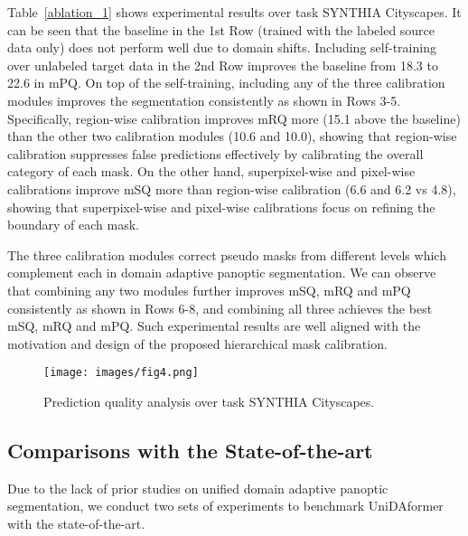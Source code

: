 \documentclass[10pt,twocolumn,letterpaper]{article}
\begin{document}
Table~\ref{ablation_1} shows experimental results over task SYNTHIA  Cityscapes. It can be seen that the baseline in the 1st Row (trained with the labeled source data only) does not perform well due to domain shifts. Including self-training over unlabeled target data in the 2nd Row improves the baseline from 18.3 to 22.6 in mPQ. On top of the self-training, including any of the three calibration modules improves the segmentation consistently as shown in Rows 3-5. Specifically, region-wise calibration improves mRQ more (15.1 above the baseline) than the other two calibration modules (10.6 and 10.0), showing that region-wise calibration suppresses false predictions effectively by calibrating the overall category of each mask. On the other hand, superpixel-wise and pixel-wise calibrations improve mSQ more than region-wise calibration (6.6 and 6.2 vs 4.8), showing that superpixel-wise and pixel-wise calibrations focus on refining the boundary of each mask.

The three calibration modules correct pseudo masks from different levels which complement each in domain adaptive panoptic segmentation. We can observe that combining any two modules further improves mSQ, mRQ and mPQ consistently as shown in Rows 6-8, and combining all three achieves the best mSQ, mRQ and mPQ. Such experimental results are well aligned with the motivation and design of the proposed hierarchical mask calibration.

\begin{figure*}[t]
\centering
\texttt{[image: images/fig4.png]}
\caption{Prediction quality analysis over task SYNTHIA  Cityscapes.
}
\label{fig:tp}
\end{figure*}










\subsection{Comparisons with the State-of-the-art}

Due to the lack of prior studies on unified domain adaptive panoptic segmentation, we conduct two sets of experiments to benchmark UniDAformer with the state-of-the-art.
\end{document}
